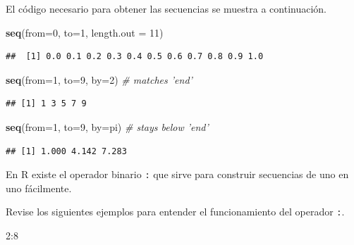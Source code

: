 \documentclass[10pt,]{krantz}
\makeatletter
\newenvironment{Shaded}{\begin{snugshade}}{\end{snugshade}}
\newcommand{\KeywordTok}[1]{\textcolor[rgb]{0.13,0.29,0.53}{\textbf{{#1}}}}
\newcommand{\DataTypeTok}[1]{\textcolor[rgb]{0.13,0.29,0.53}{{#1}}}
\newcommand{\DecValTok}[1]{\textcolor[rgb]{0.00,0.00,0.81}{{#1}}}
\newcommand{\CommentTok}[1]{\textcolor[rgb]{0.56,0.35,0.01}{\textit{{#1}}}}
\newcommand{\NormalTok}[1]{{#1}}
\let\proglang=\textsf
\newenvironment{kframe}{%
\medskip{}
\setlength{\fboxsep}{.8em}
 \def\at@end@of@kframe{}%
 \ifinner\ifhmode%
  \def\at@end@of@kframe{\end{minipage}}%
  \begin{minipage}{\columnwidth}%
 \fi\fi%
 \def\FrameCommand##1{\hskip\@totalleftmargin \hskip-\fboxsep
 \colorbox{shadecolor}{##1}\hskip-\fboxsep
     \hskip-\linewidth \hskip-\@totalleftmargin \hskip\columnwidth}%
 \MakeFramed {\advance\hsize-\width
   \@totalleftmargin\z@ \linewidth\hsize
   \@setminipage}}%
 {\par\unskip\endMakeFramed%
 \at@end@of@kframe}
\renewenvironment{Shaded}{\begin{kframe}}{\end{kframe}}
\let\BeginKnitrBlock\begin \let\EndKnitrBlock\end
\makeatother
\begin{document}
El código necesario para obtener las secuencias se muestra a
continuación.

\begin{Shaded}
\begin{Highlighting}[]
\KeywordTok{seq}\NormalTok{(}\DataTypeTok{from=}\DecValTok{0}\NormalTok{, }\DataTypeTok{to=}\DecValTok{1}\NormalTok{, }\DataTypeTok{length.out =} \DecValTok{11}\NormalTok{)}
\end{Highlighting}
\end{Shaded}

\begin{verbatim}
##  [1] 0.0 0.1 0.2 0.3 0.4 0.5 0.6 0.7 0.8 0.9 1.0
\end{verbatim}

\begin{Shaded}
\begin{Highlighting}[]
\KeywordTok{seq}\NormalTok{(}\DataTypeTok{from=}\DecValTok{1}\NormalTok{, }\DataTypeTok{to=}\DecValTok{9}\NormalTok{, }\DataTypeTok{by=}\DecValTok{2}\NormalTok{)  }\CommentTok{# matches 'end'}
\end{Highlighting}
\end{Shaded}

\begin{verbatim}
## [1] 1 3 5 7 9
\end{verbatim}

\begin{Shaded}
\begin{Highlighting}[]
\KeywordTok{seq}\NormalTok{(}\DataTypeTok{from=}\DecValTok{1}\NormalTok{, }\DataTypeTok{to=}\DecValTok{9}\NormalTok{, }\DataTypeTok{by=}\NormalTok{pi) }\CommentTok{# stays below 'end'}
\end{Highlighting}
\end{Shaded}

\begin{verbatim}
## [1] 1.000 4.142 7.283
\end{verbatim}

\BeginKnitrBlock{rmdnote}
En \proglang{R} existe el operador binario \texttt{:} que sirve para
construir secuencias de uno en uno fácilmente.
\EndKnitrBlock{rmdnote}

Revise los siguientes ejemplos para entender el funcionamiento del
operador \texttt{:}.

\begin{Shaded}
\begin{Highlighting}[]
\DecValTok{2}\NormalTok{:}\DecValTok{8}
\end{Highlighting}
\end{Shaded}
\end{document}
